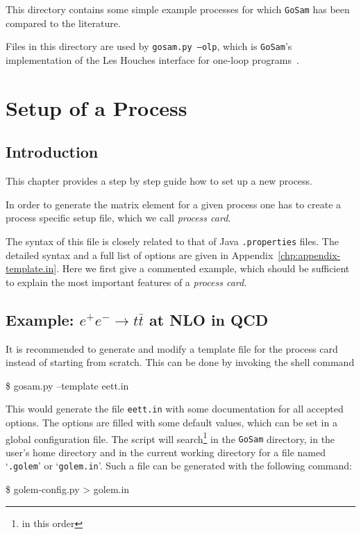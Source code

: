 \documentclass[11pt,a4paper]{refrep}
\newcommand{\golemversion}{{1{.}0}}
\newcommand{\golemv}[1][\golemversion]{{\tt GoSam}\xspace}
\begin{document}
 This directory contains some simple example
processes for which \golemv{} has been compared to the literature.

 Files in this directory are used by
\texttt{gosam.py --olp}, which is \golemv's implementation of the
Les Houches interface for one-loop programs~\cite{Binoth:2010xt}.

\chapter{Setup of a Process}
\section{Introduction}
\label{chp:setup-of-a-process}
This chapter provides a step by step guide how to
set up a new process. 

In order to generate the matrix element for a given process one has to
create a process specific setup file, which we call {\em process card}. 

The syntax of this file is
closely related to that of Java \texttt{.properties} files.
The detailed syntax and a 
full list of options are given in 
Appendix~\ref{chp:appendix-template.in}.
Here we first give a commented example, which should be sufficient to explain the 
most important features of a {\em process card}. 



\section{Example: \texorpdfstring{$e^+e^-\rightarrow t\bar{t}$}{e+e- to tt-bar}
at NLO in QCD}

It is recommended to generate and modify a template file for the 
process card instead of
starting from scratch. This can be done by invoking the shell command
\begin{example}
\$ gosam.py --template eett.in
\end{example}
This would generate the file \texttt{eett.in} with some documentation
for all accepted options. The options are filled with some default values,
which can be set in a global configuration file.
The script will search\footnote{in this order} in the \golemv{} directory,
in the user's home directory and in the current working directory for a file
named `\texttt{.golem}' or `\texttt{golem.in}'. Such a file can be generated
with the following command:
\begin{example}
\$ golem-config.py > golem.in
\end{example}
\end{document}
